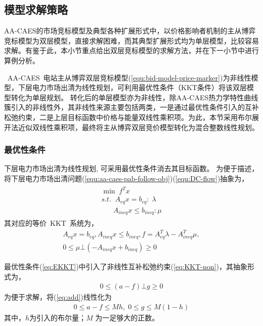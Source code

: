 \subsection{模型求解策略}
AA-CAES的市场竞标模型及典型各种扩展形式中，以价格影响者机制的主从博弈竞标模型为双层模型，直接求解困难，而其典型扩展形式均为单层模型，比较容易求解。有鉴于此，本小节重点给出双层竞标模型的求解方法，并在下一小节中进行算例分析。

~AA-CAES~电站主从博弈双层竞标模型(\ref{equ:bid-model-price-marker})为非线性模型，下层电力市场出清为线性规划，可利用最优性条件（KKT条件）将该双层模型转化为单层规划。 转化后的单层模型亦为非线性，除AA-CAES热力学特性曲线簇引入的非线性外，其非线性来源主要包括两类，一是通过最优性条件引入的互补松弛约束，二是上层目标函数中价格与能量双线性乘积项。为此，本节采用布尔展开法近似双线性乘积项\cite{Binary-Expansion-1}，最终将主从博弈双层竞价模型转化为混合整数线性规划。

\subsubsection{最优性条件}
下层电力市场出清为线性规划, 可采用最优性条件消去其目标函数。 为便于描述，将下层电力市场出清问题(\ref{equ:aa-caes-pab-follow-obj})(\ref{equ:DC-flow})抽象为，
\begin{eqnarray}
\begin{array}{l}
\min \;{f^T}x\\
s.t.\;\;{A_{eq}}x = {b_{eq}}:\;\lambda \\
\;\;\;\;\;\;{A_{ineq}}x \le {b_{ineq}}:\mu
\end{array}
\end{eqnarray}
其对应的等价~KKT~系统为，
\begin{subequations}
\label{eq:EKKT}
\begin{gather}
{A_{eq}}x = {b_{eq}}, {A_{ineq}}x \le {b_{ineq}}, f = A_{eq}^T\lambda  - A_{ineq}^T\mu, \\
 0 \le {\mu} \bot ({ - {A_{ineq}}x + {b_{ineq}}}) \ge 0 \label{eq:KKT-non}
\end{gather}
\end{subequations}

最优性条件(\ref{eq:EKKT})中引入了非线性互补松弛约束(\ref{eq:KKT-non})，其抽象形式为，
\begin{eqnarray}
\label{eq:add}
0 \le \left( {a - f} \right) \bot g \ge 0
\end{eqnarray}
为便于求解，将(\ref{eq:add})线性化为
\begin{eqnarray}
\label{equ:aa-caes-big-M}
0 \le a - f \le Mh,\;0\le g \le M\left( {1 - h} \right)
\end{eqnarray}
其中，$h$为引入的布尔量；$M$ 为一足够大的正数。

